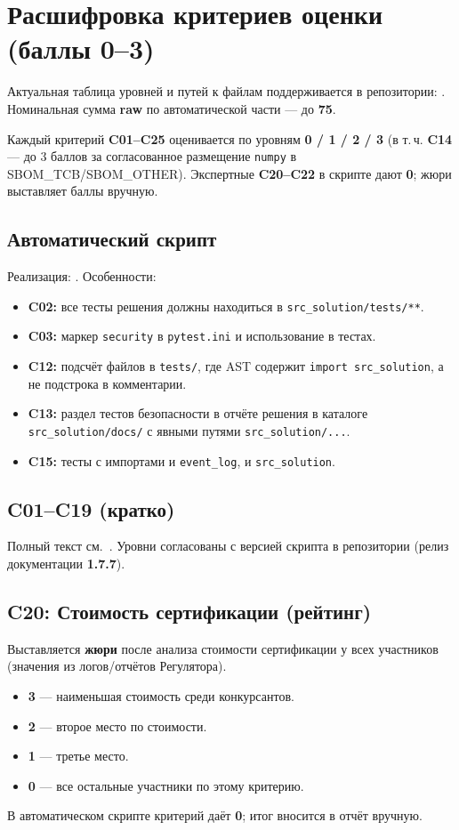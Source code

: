 \chapter{Расшифровка критериев оценки (баллы 0--3)}
\label{app:criteria-rubric}

Актуальная таблица уровней и путей к файлам поддерживается в репозитории: . Номинальная сумма \textbf{raw} по автоматической части --- до \textbf{75}.

Каждый критерий \textbf{C01--C25} оценивается по уровням \textbf{0 / 1 / 2 / 3} (в т.\,ч. \textbf{C14} --- до 3 баллов за согласованное размещение \texttt{numpy} в SBOM\_TCB/SBOM\_OTHER). Экспертные \textbf{C20--C22} в скрипте дают \textbf{0}; жюри выставляет баллы вручную.

\section*{Автоматический скрипт}
Реализация: . Особенности:
\begin{itemize}
  \item \textbf{C02:} все тесты решения должны находиться в \texttt{src\_solution/tests/**}.
  \item \textbf{C03:} маркер \texttt{security} в \texttt{pytest.ini} и использование в тестах.
  \item \textbf{C12:} подсчёт файлов в \texttt{tests/}, где AST содержит \texttt{import src\_solution}, а не подстрока в комментарии.
  \item \textbf{C13:} раздел тестов безопасности в отчёте решения в каталоге \texttt{src\_solution/docs/} с явными путями \texttt{src\_solution/...}.
  \item \textbf{C15:} тесты с импортами и \texttt{event\_log}, и \texttt{src\_solution}.
\end{itemize}

\section*{C01--C19 (кратко)}
Полный текст см.\ . Уровни согласованы с версией скрипта в репозитории (релиз документации \textbf{1.7.7}).

\section*{C20: Стоимость сертификации (рейтинг)}
Выставляется \textbf{жюри} после анализа стоимости сертификации у всех участников (значения из логов/отчётов Регулятора).
\begin{itemize}
  \item \textbf{3} --- наименьшая стоимость среди конкурсантов.
  \item \textbf{2} --- второе место по стоимости.
  \item \textbf{1} --- третье место.
  \item \textbf{0} --- все остальные участники по этому критерию.
\end{itemize}
В автоматическом скрипте критерий даёт \textbf{0}; итог вносится в отчёт вручную.

